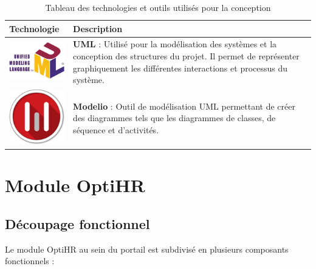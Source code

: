 \begin{center}
    \begin{table}[H]
        \begin{tabular}{|m{4cm}|m{10cm}|}
            \hline
            \textbf{Technologie}                                 & \textbf{Description}                                                                                                                                                                             \\
            \hline
            \includegraphics[width=3cm]{images/logo/uml.png}     & \textbf{UML} : Utilisé pour la modélisation des systèmes et la conception des structures du projet. Il permet de représenter graphiquement les différentes interactions et processus du système. \\
            \hline
            \includegraphics[width=3cm]{images/logo/modelio.png} & \textbf{Modelio} : Outil de modélisation UML permettant de créer des diagrammes tels que les diagrammes de classes, de séquence et d'activités.                                                  \\
            \hline
        \end{tabular}
        \caption{Tableau des technologies et outils utilisés pour la conception}
        \label{tab:technos_conception}
    \end{table}
\end{center}

\section{Module OptiHR}

\subsection{Découpage fonctionnel}
Le module OptiHR au sein du portail est subdivisé en plusieurs composants fonctionnels :

